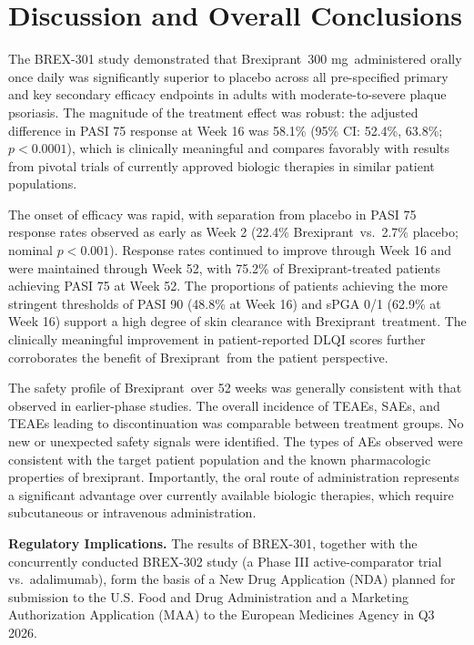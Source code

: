 \documentclass[11pt, a4paper]{article}
\newcommand{\studydrug}{Brexiprant}
\newcommand{\studydose}{300 mg}
\begin{document}
\section{Discussion and Overall Conclusions}

The BREX-301 study demonstrated that \studydrug\ \studydose\ administered orally once daily was significantly superior to placebo across all pre-specified primary and key secondary efficacy endpoints in adults with moderate-to-severe plaque psoriasis. The magnitude of the treatment effect was robust: the adjusted difference in PASI 75 response at Week 16 was 58.1\% (95\% CI: 52.4\%, 63.8\%; $p < 0.0001$), which is clinically meaningful and compares favorably with results from pivotal trials of currently approved biologic therapies in similar patient populations.

\vspace{4pt}
The onset of efficacy was rapid, with separation from placebo in PASI 75 response rates observed as early as Week 2 (22.4\% \studydrug\ vs.\ 2.7\% placebo; nominal $p < 0.001$). Response rates continued to improve through Week 16 and were maintained through Week 52, with 75.2\% of \studydrug-treated patients achieving PASI 75 at Week 52. The proportions of patients achieving the more stringent thresholds of PASI 90 (48.8\% at Week 16) and sPGA 0/1 (62.9\% at Week 16) support a high degree of skin clearance with \studydrug\ treatment. The clinically meaningful improvement in patient-reported DLQI scores further corroborates the benefit of \studydrug\ from the patient perspective.

\vspace{4pt}
The safety profile of \studydrug\ over 52 weeks was generally consistent with that observed in earlier-phase studies. The overall incidence of TEAEs, SAEs, and TEAEs leading to discontinuation was comparable between treatment groups. No new or unexpected safety signals were identified. The types of AEs observed were consistent with the target patient population and the known pharmacologic properties of brexiprant. Importantly, the oral route of administration represents a significant advantage over currently available biologic therapies, which require subcutaneous or intravenous administration.

\begin{notebox}
\textbf{Regulatory Implications.} The results of BREX-301, together with the concurrently conducted BREX-302 study (a Phase III active-comparator trial vs.\ adalimumab), form the basis of a New Drug Application (NDA) planned for submission to the U.S. Food and Drug Administration and a Marketing Authorization Application (MAA) to the European Medicines Agency in Q3 2026.
\end{notebox}
\end{document}
